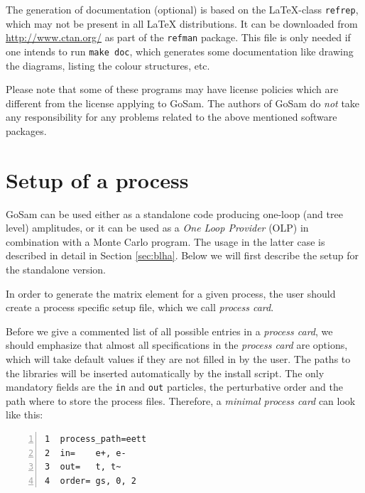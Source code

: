 \documentclass[11pt,a4paper]{refrep}
\newcommand{\gosamversion}{{2{.}0}}
\newcommand{\gosam}{{\sc GoSam}\xspace}
\newcommand{\gosamv}[1][\gosamversion]{{\sc GoSam}\xspace}
\begin{document}
 The generation of documentation (optional)
is based on the \LaTeX-class \texttt{refrep}, which may not be
present in all \LaTeX{}
distributions. It can be downloaded from \url{http://www.ctan.org/}
as part of the \texttt{refman} package.
This file is only needed if one intends to run \texttt{make doc},
which generates some documentation like drawing the diagrams, 
listing the colour structures, etc.

\attention Please note that some of these programs may have
license policies which are different from the license
applying to \gosamv. The authors of \gosamv do \emph{not}
take any responsibility for any problems related to the
above mentioned software packages.



\chapter{Setup of a process}
\label{chp:setup-of-a-process}


\gosam{} can be used either as a standalone code producing one-loop 
(and tree level) amplitudes, or it can be used as a {\it One Loop Provider} (OLP)
in combination with a Monte Carlo program. 
The usage in the latter case is described in detail in Section \ref{sec:blha}. 
Below we will first describe the setup for the standalone version.


In order to generate the matrix element for a given process, the user should
create a process specific setup file, which we call {\em process card}. 


Before we give a commented list of all possible entries in a {\em process card}, 
we should emphasize that almost all specifications 
in the {\em process card} are options, which will take default values if they are not 
filled in by the user. The paths to the libraries will be inserted 
automatically by the install script.
The only mandatory fields are the {\tt in} and {\tt out} 
particles, the perturbative order and the path where to store the process files.
Therefore, a {\em minimal process card} can look like this:
\begin{lstlisting}[gobble=3,%
     numbers=left,caption={{\tt eett.in}},%
     basicstyle=\ttfamily]
1  process_path=eett
2  in=    e+, e-
3  out=   t, t~
4  order= gs, 0, 2
\end{lstlisting}
\end{document}
